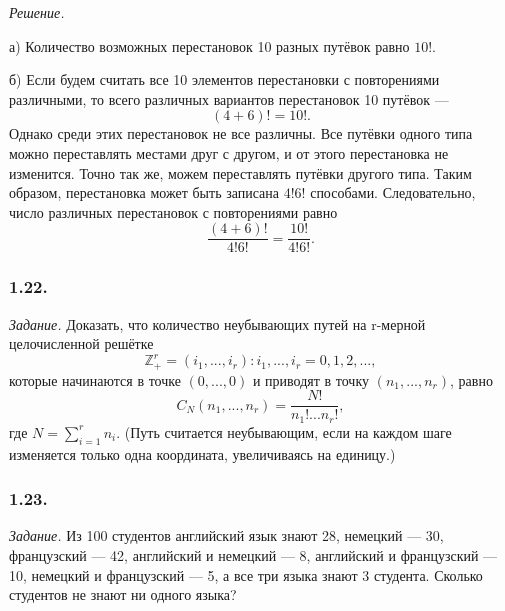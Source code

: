 \documentclass{book}
\begin{document}
\textit{Решение.}

а) Количество возможных перестановок 10 разных путёвок равно $10!$.

б) Если будем считать все 10 элементов перестановки с повторениями различными, то всего различных вариантов перестановок 10 путёвок --- $$(4+6)!=10!.$$ Однако среди этих перестановок не все различны. Все путёвки одного типа можно переставлять местами друг с другом, и от этого перестановка не изменится. Точно так же, можем переставлять путёвки другого типа. Таким образом, перестановка может быть записана $4!6!$ способами. Следовательно, число различных перестановок с повторениями равно $$\frac{(4+6)!}{4!6!}=\frac{10!}{4!6!}.$$

\subsubsection*{1.22.}

\textit{Задание.} Доказать, что количество неубывающих путей на r-мерной целочисленной решётке $$\mathbb{Z}_+^r={\left(i_1, ..., i_r\right): i_1, ..., i_r=0, 1, 2, ...},$$ которые начинаются в точке $\left(0, ..., 0\right)$ и приводят в точку $\left(n_1, ..., n_r\right)$, равно $$C_N\left(n_1, ..., n_r\right)=\frac{N!}{n_1!...n_r!},$$ где $N=\sum\limits_{i=1}^rn_i$. (Путь считается неубывающим, если на каждом шаге изменяется только одна координата, увеличиваясь на единицу.)

\subsubsection*{1.23.}

\textit{Задание.} Из 100 студентов английский язык знают 28, немецкий --- 30, французский --- 42, английский и немецкий --- 8, английский и французский --- 10, немецкий и французский --- 5, а все три языка знают 3 студента. Сколько студентов не знают ни одного языка?
\end{document}
